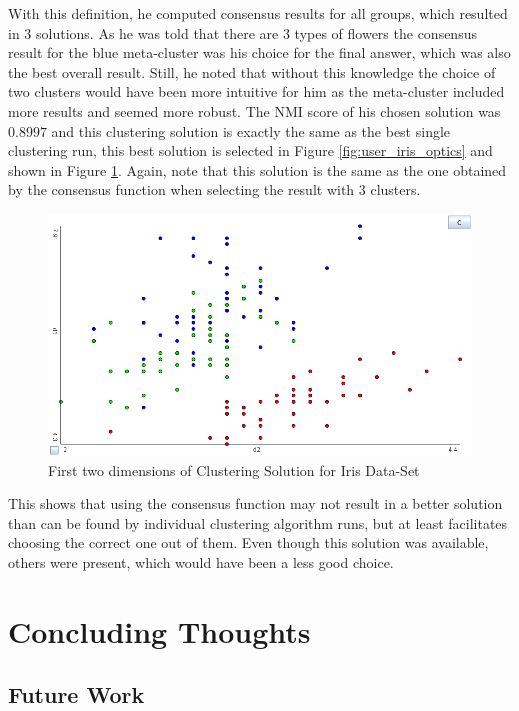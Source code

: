 \documentclass[
	a4paper,
	english,
	twoside,
	openright,               
	11pt                            
	]{report}
\begin{document}
With this definition, he computed consensus results for all groups, which resulted in 3 solutions. As he was told that there are 3 types of flowers the consensus result for the blue meta-cluster was his choice for the final answer, which was also the best overall result. Still, he noted that without this knowledge the choice of two clusters would have been more intuitive for him as the meta-cluster included more results and seemed more robust. The NMI score of his chosen solution was $0.8997$ and this clustering solution is exactly the same as the best single clustering run, this best solution is selected in Figure \ref{fig:user_iris_optics} and shown in Figure \ref{fig:user_iris_best}. Again, note that this solution is the same as the one obtained by the consensus function when selecting the result with $3$ clusters.

\begin{figure}[h]
	\centering
	\includegraphics[scale=.5]{user_iris_best}
	\caption{First two dimensions of Clustering Solution for Iris Data-Set}
	\label{fig:user_iris_best}
\end{figure}

This shows that using the consensus function may not result in a better solution than can be found by individual clustering algorithm runs, but at least facilitates choosing the correct one out of them. Even though this solution was available, others were present, which would have been a less good choice.

\part{Concluding Thoughts}

\chapter{Future Work}\label{cha:futurework}
\end{document}
